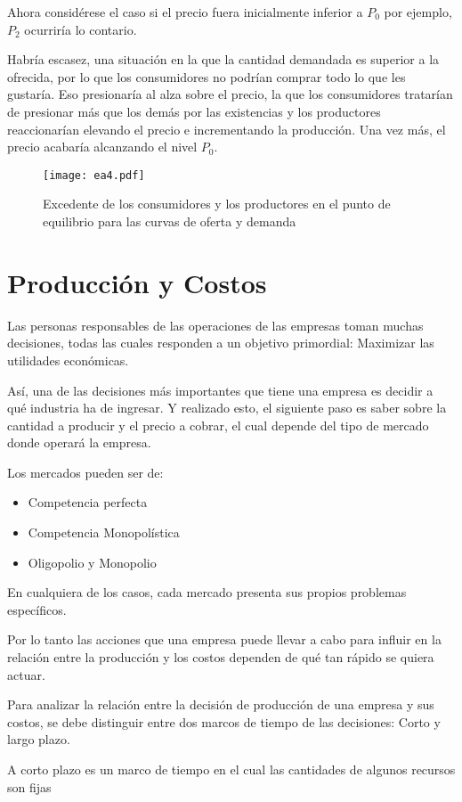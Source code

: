 Ahora considérese el caso si el precio fuera inicialmente inferior a $P_0$ por ejemplo, $P_2$ ocurriría lo contario.

Habría escasez, una situación en la que la cantidad demandada es superior a la ofrecida, por lo que los consumidores no podrían comprar todo lo que les gustaría. Eso presionaría al alza sobre el precio, la que los consumidores tratarían de presionar más que los demás por las existencias y los productores reaccionarían elevando el precio e incrementando la producción. Una vez más, el precio acabaría alcanzando el nivel $P_0$.
\begin{figure}[h!]
\centering
  \texttt{[image: ea4.pdf]}
  \caption{Excedente de los consumidores y los productores en el punto de equilibrio para las curvas de oferta y demanda}
  \label{ea4}
\end{figure}
\section{Producción y Costos}
Las personas responsables de las operaciones de las empresas toman muchas decisiones, todas las cuales responden a un objetivo primordial: Maximizar las utilidades económicas.

Así, una de las decisiones más importantes que tiene una empresa es decidir a qué industria ha de ingresar. Y realizado esto, el siguiente paso es saber sobre la cantidad a producir y el precio a cobrar, el cual depende del tipo de mercado donde operará la empresa.

Los mercados pueden ser de:
\begin{itemize}
    \item Competencia perfecta
    \item Competencia Monopolística
    \item Oligopolio y Monopolio
\end{itemize}
En cualquiera de los casos, cada mercado presenta sus propios problemas específicos.

Por lo tanto las acciones que una empresa puede llevar a cabo para influir en la relación entre la producción y los costos dependen de qué tan rápido se quiera actuar.

Para analizar la relación entre la decisión de producción de una empresa y sus costos, se debe distinguir entre dos marcos de tiempo de las decisiones: Corto y largo plazo.

A corto plazo es un marco de tiempo en el cual las cantidades de algunos recursos son fijas

